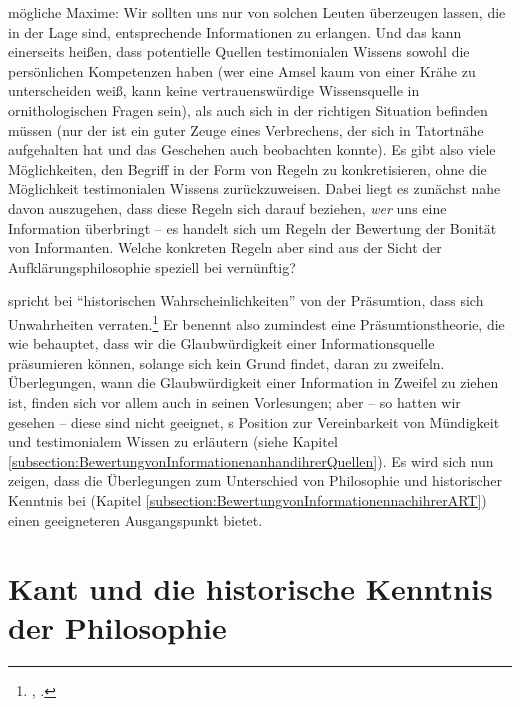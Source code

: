 mögliche Maxime: Wir sollten uns nur von solchen Leuten überzeugen
lassen, die in der Lage sind, entsprechende Informationen zu erlangen. Und das
kann einerseits heißen, dass potentielle Quellen testimonialen Wissens sowohl
die persönlichen Kompetenzen haben (wer eine Amsel kaum von einer Krähe
zu unterscheiden weiß, kann keine vertrauenswürdige Wissensquelle in
ornithologischen Fragen sein), als auch sich in der richtigen Situation befinden müssen (nur der ist ein
guter Zeuge eines Verbrechens, der sich in Tatortnähe aufgehalten hat und das
Geschehen auch beobachten konnte). Es gibt also viele Möglichkeiten, den Begriff
in der Form von Regeln zu konkretisieren, ohne die
Möglichkeit testimonialen Wissens zurückzuweisen. Dabei liegt es zunächst nahe davon auszugehen, dass diese
Regeln sich darauf beziehen, \emph{wer} uns eine Information überbringt -- es
handelt sich um Regeln der Bewertung der Bonität von Informanten. Welche
konkreten Regeln aber sind aus der Sicht der Aufklärungsphilosophie speziell bei
 vernünftig?

 spricht  bei \enquote{historischen
Wahrscheinlichkeiten} von der Präsumtion, dass sich Unwahrheiten
verraten.\footnote{\cite[Vgl.][]{Kant:Reflexionen1900ff.},
\cite[][XVI: 430.4--6]{Kant:GesammelteWerke1900ff.}.} Er benennt also zumindest
eine Präsumtionstheorie, die wie
behauptet, dass wir die Glaubwürdigkeit einer Informationsquelle präsumieren
können, solange sich kein Grund findet, daran zu zweifeln. Überlegungen, wann die Glaubwürdigkeit einer Information in
Zweifel zu ziehen ist, finden sich vor allem auch in seinen Vorlesungen; aber --
so hatten wir gesehen -- diese sind nicht geeignet, s
Position zur Vereinbarkeit von Mündigkeit und testimonialem Wissen zu
erläutern (siehe Kapitel
\ref{subsection:BewertungvonInformationenanhandihrerQuellen}). Es wird sich nun
zeigen, dass die Überlegungen zum Unterschied von Philosophie und historischer
Kenntnis bei 
(Kapitel \ref{subsection:BewertungvonInformationennachihrerART}) einen
geeigneteren Ausgangspunkt bietet.



\section{Kant und die historische
Kenntnis der Philosophie}\label{section:MuendigkeitundPhilosophie}

